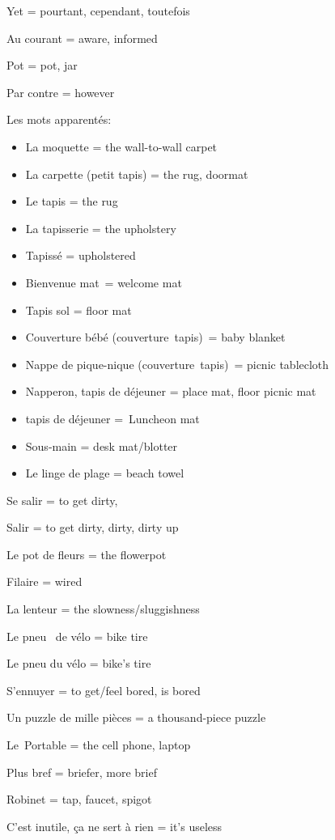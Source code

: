 Yet = pourtant, cependant, toutefois~

{Au courant = aware, informed~}

{Pot = pot, jar}

{Par contre = however~}

{Les mots apparentés:}

\begin{itemize}
\item
  {La moquette = the wall-to-wall carpet}
\item
  {La carpette (petit tapis) = the rug, doormat}
\item
  {Le tapis = the rug}
\item
  {La tapisserie = the upholstery~}
\item
  {Tapissé = upholstered~}
\item
  {Bienvenue mat~= welcome mat}
\item
  {Tapis sol = floor mat}
\item
  {Couverture bébé (couverture~tapis)~= baby blanket~}
\item
  {Nappe de pique-nique (couverture~tapis)~= picnic tablecloth~}
\item
  Napperon, tapis de déjeuner = place mat, floor picnic mat
\item
  tapis de déjeuner =~Luncheon mat
\item
  Sous-main = desk mat/blotter
\item
  Le linge de plage = beach towel~
\end{itemize}

{Se salir = to get dirty,}

{Salir = to get dirty, dirty, dirty up}

{Le pot de fleurs = the flowerpot~}

{Filaire = wired}

{La lenteur = the slowness/sluggishness~}

{Le pneu~ de vélo = bike tire}

{Le pneu du vélo = bike's tire}

{S'ennuyer = to get/feel bored, is bored}

{Un puzzle de mille pièces = a thousand-piece puzzle}

{Le~Portable = the cell phone, laptop}

{Plus bref = briefer, more brief~}

{Robinet = tap, faucet, spigot}

{C'est inutile, ça ne sert à rien = it's useless~}

